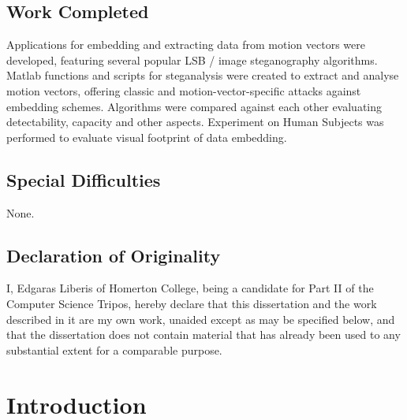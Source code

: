 \documentclass[12pt,british,twoside,notitlepage,usenames,dvipsnames,hypens,final]{report}
\renewcommand\thesubsection{\arabic{subsection}.}
\numberwithin{equation}{section}
\numberwithin{figure}{section}
\newcommand*\circled[1]{\tikz[baseline=(char.base)]{
            \node[shape=circle,draw,inner sep=2pt] (char) {#1};}}
\begin{document}
\section*{Work Completed}

Applications for embedding and extracting data from motion vectors were developed, featuring several popular LSB / image steganography algorithms. Matlab functions and scripts for steganalysis were created to extract and analyse motion vectors, offering classic and motion-vector-specific attacks against embedding schemes. Algorithms were compared against each other evaluating detectability, capacity and other aspects. Experiment on Human Subjects was performed to evaluate visual footprint of data embedding.

\section*{Special Difficulties}

None.

\cleardoublepage

\section*{Declaration of Originality}
I, Edgaras Liberis of Homerton College, being a candidate for Part II of the Computer Science Tripos, hereby declare that this dissertation and the work described in it are my own work, unaided except as may be specified below, and that the dissertation does not contain material that has already been used to any substantial extent for a comparable purpose.

\bigskip
{}

\medskip
{}

\newpage
\tableofcontents

\renewcommand{\thesection}{\arabic{chapter}.\arabic{section}}
\renewcommand{\thesubsection}{\arabic{chapter}.\arabic{section}.\arabic{subsection}}
\setcounter{chapter}{1}
\newcommand{\chapterheader}[2]{%
	\cleardoublepage
	\setcounter{chapter}{#1}
	\setcounter{section}{0}
	\chapter*{\scalebox{2}{\circled{#1}} \:\: #2 \hfill}
}
\setcounter{page}{1}
\pagestyle{headings}

\chapterheader{1}{Introduction}
 
\end{document}
